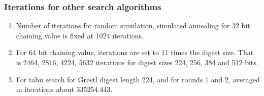 \documentclass{beamer}
\begin{document}

\begin{frame}
\frametitle{Iterations for other search algorithms}
\begin{enumerate}
\item Number of iterations for random simulation, simulated annealing for 32 bit chaining value is fixed
at 1024 iterations.
\item For 64 bit chaining value, iterations are set to 11 times the digest size. That is 2464, 2816, 4224,
5632 iterations for digest sizes 224, 256, 384 and 512 bits.
\item For tabu search for Gr{\o}stl digest length 224, and for rounds 1 and 2, averaged in iterations 
about 335254.443.
\end{enumerate}
\end{frame}
\end{document}

